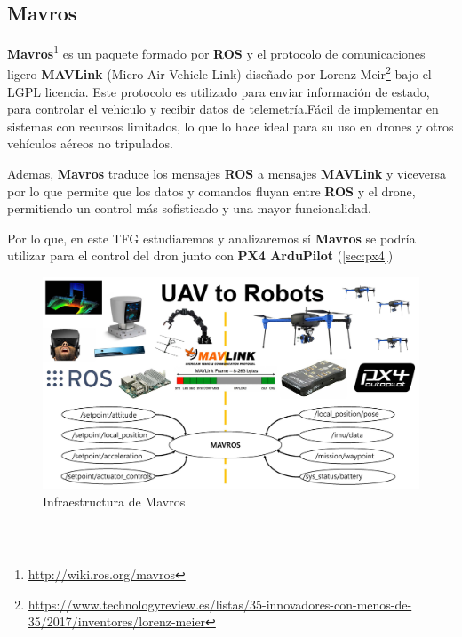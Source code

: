 \subsection{Mavros}
\label{sec:mavros}

\textbf{Mavros}\footnote{\url{http://wiki.ros.org/mavros}} es un paquete formado por \textbf{ROS} y el protocolo de comunicaciones ligero \textbf{MAVLink} (Micro Air Vehicle Link) diseñado por Lorenz Meir\footnote{\url{https://www.technologyreview.es/listas/35-innovadores-con-menos-de-35/2017/inventores/lorenz-meier}} bajo el LGPL licencia. Este protocolo es utilizado para enviar información de estado,
para controlar el vehículo y recibir datos de telemetría.Fácil de implementar en sistemas con recursos limitados, 
lo que lo hace ideal para su uso en drones y otros vehículos aéreos no tripulados. \newline

Ademas, \textbf{Mavros} traduce los mensajes \textbf{ROS} a mensajes \textbf{MAVLink} y viceversa por lo que permite que los datos y comandos fluyan entre \textbf{ROS} y el drone, 
permitiendo un control más sofisticado y una mayor funcionalidad. \newline

Por lo que, en este TFG estudiaremos y analizaremos sí \textbf{Mavros} se podría utilizar para el control del dron junto con \textbf{PX4 ArduPilot} (\ref{sec:px4}) \newline

\begin{figure} [H]
  \begin{center}
    \includegraphics[scale=0.4]{figs/Plataformas_Desarollo/mavros.jpg}
  \end{center}
  \caption{Infraestructura de Mavros}
  \label{fig:InfraROS}
\end{figure}\

